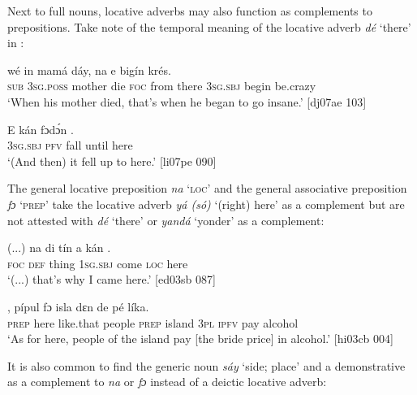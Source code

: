 Next to full nouns, locative adverbs\index{} may also function as complements to prepositions. Take note of the temporal meaning of the locative adverb \textit{dé} ‘there’ in :


\ea%
    \label{ex:key:902}
    \gll wé  in    mamá  dáy,  na          e    bigín  krés.\\
\textsc{sub}  \textsc{3sg.poss}  mother  die  \textsc{foc}  from  there  \textsc{3sg.sbj}  begin  be.crazy\\

\glt ‘When his mother died, that’s when he began to go insane.’ [dj07ae 103]
\z


\ea%
    \label{ex:key:903}
    \gll E    kán    fɔdɔ́n      .\\
\textsc{3sg.sbj}  \textsc{pfv}    fall    until  here\\

\glt ‘(And then) it fell up to here.’ [li07pe 090]
\z

The general locative preposition \textit{na} ‘\textsc{loc}’ and the general associative preposition \textit{fɔ} ‘\textsc{prep}’ take the locative adverb \textit{yá (só)} ‘(right) here’ as a complement but are not attested with \textit{dé} ‘there’ or\textit{ yandá} ‘yonder’ as a complement: 


\ea%
    \label{ex:key:904}
    \gll (...)  na  di  tín    a    kán      .\\
{}  \textsc{foc}  \textsc{def}  thing  \textsc{1sg.sbj}  come  \textsc{loc}  here\\

\glt ‘(...) that’s why I came here.’ [ed03sb 087]
\z


\ea%
    \label{ex:key:905}
    \gll {}      ,    pípul  fɔ  isla    dɛn  de  pé  líka.\\
\textsc{prep}  here    like.that  people  \textsc{prep}  island  \textsc{3pl}  \textsc{ipfv}  pay  alcohol\\

\glt ‘As for here, people of the island pay [the bride price] in alcohol.’ [hi03cb 004]
\z

It is also common to find the generic noun \textit{sáy} ‘side; place’ and a demonstrative as a complement to \textit{na} or \textit{fɔ} instead of a deictic locative adverb: 


